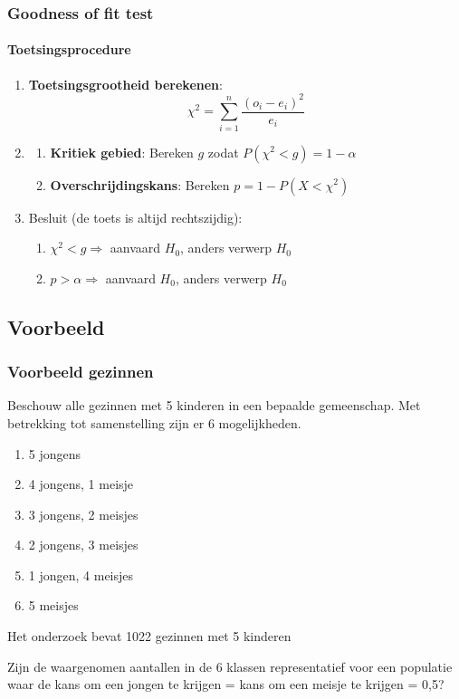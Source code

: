 \documentclass[aspectratio=169]{beamer}
\begin{document}
\begin{frame}
\frametitle{Goodness of fit test}
\framesubtitle{Toetsingsprocedure}

\begin{enumerate}
  \item \textbf{Toetsingsgrootheid berekenen}:
  \[ \chi^{2} = \sum_{i=1}^{n} \frac{(o_{i} - e_{i})^{2}}{e_{i}} \]
  \item 
  \begin{enumerate}
    \item \textbf{Kritiek gebied}: Bereken $g$ zodat $P(\chi^2 < g) = 1 - \alpha$
    \item \textbf{Overschrijdingskans}: Bereken $p = 1 - P(X < \chi^2)$
  \end{enumerate}
  
\item Besluit (de toets is altijd rechtszijdig):
  \begin{enumerate}
    \item $\chi^2 < g \Rightarrow$ aanvaard $H_0$, anders verwerp $H_0$
    \item $p > \alpha \Rightarrow$ aanvaard $H_0$, anders verwerp $H_0$
  \end{enumerate}
\end{enumerate}
\end{frame}


\subsection{Voorbeeld}

\begin{frame}
  \frametitle{Voorbeeld gezinnen}
  Beschouw alle gezinnen met 5 kinderen in een bepaalde gemeenschap.
  \pause
  Met betrekking tot samenstelling zijn er 6 mogelijkheden.
\begin{enumerate}
  \item 5 jongens
  \item 4 jongens, 1 meisje
  \item 3 jongens, 2 meisjes
  \item 2 jongens, 3 meisjes
  \item 1 jongen, 4 meisjes
  \item 5 meisjes
\end{enumerate}
Het onderzoek bevat 1022 gezinnen met 5 kinderen
\begin{center}
Zijn de waargenomen aantallen in de 6 klassen representatief voor een populatie waar de kans om een jongen te krijgen = kans om een meisje te krijgen = 0,5?
\end{center}
\end{frame}
\end{document}
